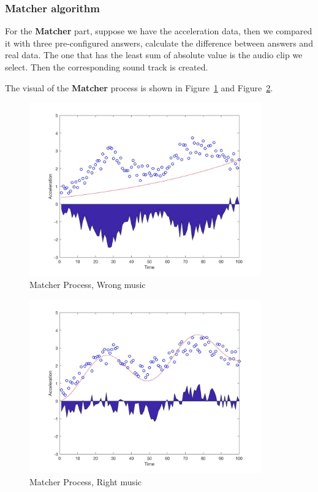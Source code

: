\subsubsection{Matcher algorithm}

For the \textbf{Matcher} part, suppose we have the acceleration data, then we
compared it with three pre-configured answers, calculate the difference between
answers and real data. The one that has the least sum of absolute value is the
audio clip we select. Then the corresponding sound track is created. 

The visual of the \textbf{Matcher} process is shown in Figure~\ref{matcherStep0}
and Figure~\ref{matcherStep1}.


\newcommand{\widthOfMatcherFigure}{10cm}

\begin{figure}[H]
\centering
\includegraphics[width=\widthOfMatcherFigure]{figWR/matcher1}
\caption{Matcher Process, Wrong music}
\label{matcherStep0}
\end{figure}

\begin{figure}[H]
\centering
\includegraphics[width=\widthOfMatcherFigure]{figWR/matcher2}
\caption{Matcher Process, Right music}
\label{matcherStep1}
\end{figure}

